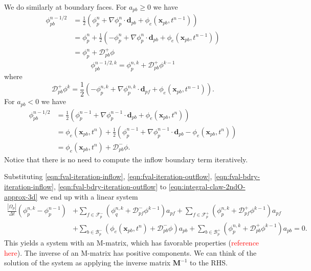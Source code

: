 \documentclass[../thesis.tex]{subfiles}
\begin{document}
We do similarly at boundary faces. For \(a_{pb} \geq 0\) we have
\begin{equation}
	\begin{split}
		\phi_{pb}^{n-1/2}
		&= \frac{1}{2}
		\left(
			\phi_p^{n} + \nabla\phi_p^{n}\cdot\mathbf{d}_{pb}
			+ \phi_e(\mathbf{x}_{pb}, t^{n-1})
		\right)\\
		&= \phi_p^{n} + \frac{1}{2}
		\left(
			-\phi_p^{n} + \nabla\phi_p^{n}\cdot\mathbf{d}_{pb}
			+ \phi_e(\mathbf{x}_{pb}, t^{n-1})
		\right)\\
		&= \phi_p^{n} + \mathcal{D}^+_{pb}\phi
	\end{split}
\end{equation}
\begin{equation}\label{eqn:fval-bdry-iteration-outflow}
	\phi_{pb}^{n-1/2,k} = \phi_p^{n,k} + \mathcal{D}^+_{pb}\phi^{k-1}
\end{equation}
where
\begin{equation}\label{eqn:correction-bdry-term-outflow}
	\mathcal{D}^+_{pb}\phi^{k} =
	\frac{1}{2}\left(
		-\phi_p^{n,k} + \nabla\phi_p^{n,k}\cdot\mathbf{d}_{pf} + \phi_e(\mathbf{x}_{pb}, t^{n-1})
		\right).
\end{equation}
For \(a_{pb} < 0\) we have
\begin{equation}\label{eqn:fval-bdry-iteration-inflow}
	\begin{split}
		\phi_{pb}^{n-1/2}
		&= \frac{1}{2}
		\left(
			\phi_p^{n-1} + \nabla\phi_p^{n-1}\cdot\mathbf{d}_{pb} + \phi_e(\mathbf{x}_{pb}, t^{n})
		\right)\\
		&= \phi_e(\mathbf{x}_{pb}, t^{n}) + \frac{1}{2}
		\left(
			\phi_p^{n-1} + \nabla\phi_p^{n-1}\cdot\mathbf{d}_{pb} - \phi_e(\mathbf{x}_{pb}, t^{n})
		\right)\\
		&= \phi_e(\mathbf{x}_{pb}, t^{n}) + \mathcal{D}^-_{pb}\phi.
	\end{split}
\end{equation}
Notice that there is no need to compute the inflow boundary term iteratively.

Substituting \eqref{eqn:fval-iteration-inflow}, \eqref{eqn:fval-iteration-outflow},
\eqref{eqn:fval-bdry-iteration-inflow}, \eqref{eqn:fval-bdry-iteration-outflow} to
\eqref{eqn:integral-claw-2ndO-approx-3d} we end up with a linear system
\begin{equation}\label{eqn:system-no-limiter}
	\begin{split}
		\frac{|\Omega_p|}{\Delta t}(\phi^{n,k}_p - \phi_p^{n-1})
		&+ \sum_{f \in \mathcal{F}_p^-}
		\left(
			\phi_q^{n,k} + \mathcal{D}^-_{pf}\phi^{k-1}
		\right) a_{pf}
		+ \sum_{f \in \mathcal{F}_p^+}
		\left(
			\phi_p^{n,k} + \mathcal{D}^+_{pf}\phi^{k-1}
		\right) a_{pf}\\
		&+ \sum_{b \in \mathcal{B}_p^-}
		\left(
			\phi_e(\mathbf{x}_{pb}, t^{n})
			+ \mathcal{D}^-_{pb}\phi
		\right) a_{pb}
		+ \sum_{b \in \mathcal{B}_p^+}
		\left(\phi_p^{n,k} +
		\mathcal{D}^+_{pb}\phi^{k-1}\right) a_{pb} = 0.
	\end{split}
\end{equation}
This yields a system with an M-matrix, which has favorable properties
(\textcolor{red}{reference here}). The inverse of an M-matrix has
positive components. We can think of the solution of the system as
applying the inverse matrix \(\mathbf{M}^{-1}\) to the RHS.
\end{document}
